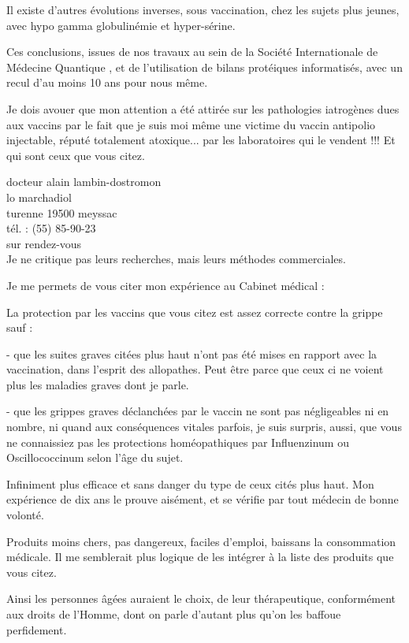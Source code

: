 Il existe d'autres évolutions inverses, sous vaccination, chez les sujets plus jeunes, avec hypo gamma globulinémie et hyper-sérine.

Ces conclusions, issues de nos travaux au sein de la Société Internationale de Médecine Quantique , et de l'utilisation de bilans protéiques informatisés, avec un recul d'au moins 10 ans pour nous même.

Je dois avouer que mon attention a été attirée sur les pathologies iatrogènes dues aux vaccins par le fait que je suis moi même une victime du vaccin antipolio injectable, réputé totalement atoxique... par les laboratoires qui le vendent !!! Et qui sont ceux que vous citez.

docteur alain lambin-dostromon\\
lo marchadiol\\
turenne 19500 meyssac\\
tél. : (55) 85-90-23\\
sur rendez-vous\\

Je ne critique pas leurs recherches, mais leurs méthodes commerciales.

Je me permets de vous citer mon expérience au Cabinet médical :

La protection par les vaccins que vous citez est assez correcte contre la grippe sauf :

- que les suites graves citées plus haut n'ont pas été mises en rapport avec la vaccination, dans l'esprit des allopathes. Peut être parce que ceux ci ne voient plus les maladies graves dont je parle.

- que les grippes graves déclanchées par le vaccin ne sont pas négligeables ni en nombre, ni quand aux conséquences vitales parfois, je suis surpris, aussi, que vous ne connaissiez pas les protections homéopathiques par Influenzinum ou Oscillococcinum selon l'âge du sujet.

Infiniment plus efficace et sans danger du type de ceux cités plus haut. Mon expérience de dix ans le prouve aisément, et se vérifie par tout médecin de bonne volonté.

Produits moins chers, pas dangereux, faciles d'emploi, baissans la consommation médicale. Il me semblerait plus logique de les intégrer à la liste des produits que vous citez.

Ainsi les personnes âgées auraient le choix, de leur thérapeutique, conformément aux droits de l'Homme, dont on parle d'autant plus qu'on les baffoue perfidement.

